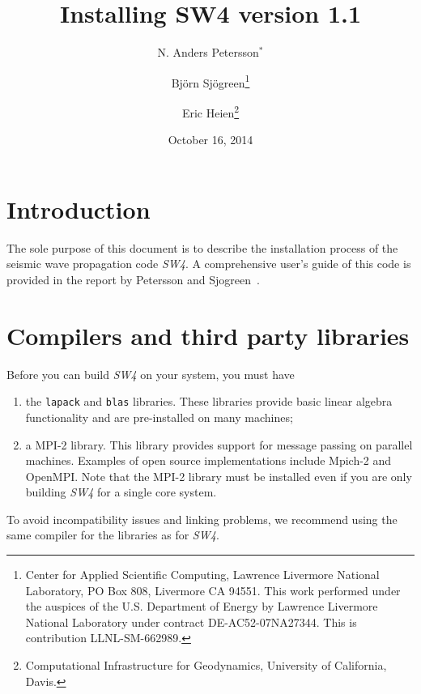 \documentclass[11pt]{article}
\begin{document}
\title{Installing SW4 version 1.1}

\author{ N. Anders Petersson$^*$ \and Bj\"orn Sj\"ogreen\thanks{Center for Applied Scientific
    Computing, Lawrence Livermore National Laboratory, PO Box 808, Livermore CA 94551. This work
    performed under the auspices of the U.S. Department of Energy by Lawrence Livermore National
    Laboratory under contract DE-AC52-07NA27344. This is contribution LLNL-SM-662989.} \and Eric
  Heien\thanks{Computational Infrastructure for Geodynamics, University of California, Davis.}}
\date{October 16, 2014} \maketitle




\tableofcontents

\section{Introduction}
The sole purpose of this document is to describe the installation process of the seismic wave
propagation code \emph{SW4}. A comprehensive user's guide of this code is provided in the report by
Petersson and Sjogreen~\cite{SW4-11}.

\section{Compilers and third party libraries}

Before you can build \emph{SW4} on your system, you must have
\begin{enumerate}
\item the \verb+lapack+ and \verb+blas+ libraries. These libraries provide basic linear algebra
  functionality and are pre-installed on many machines;
\item a MPI-2 library. This library provides support for message passing on parallel
  machines. Examples of open source implementations include Mpich-2 and OpenMPI. Note that the MPI-2
  library must be installed even if you are only building \emph{SW4} for a single core system.
\end{enumerate}
To avoid incompatibility issues and linking problems, we recommend using the same compiler for
the libraries as for \emph{SW4}.
\end{document}
